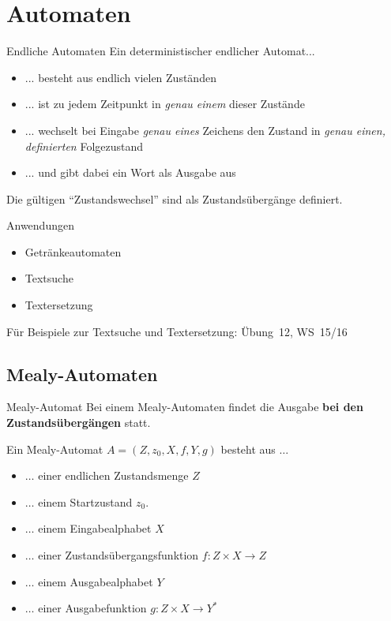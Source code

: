 \section{Automaten}

\begin{frame}{Endliche Automaten}
	Ein deterministischer endlicher Automat...
	\begin{itemize}
		\item ... besteht aus endlich vielen Zuständen
		\item ... ist zu jedem Zeitpunkt in \emph{genau einem} dieser Zustände
		\item ... wechselt bei Eingabe \emph{genau eines} Zeichens den Zustand in \emph{genau einen, definierten} Folgezustand
		\item ... und gibt dabei ein Wort als Ausgabe aus
	\end{itemize}

	Die gültigen \enquote{Zustandswechsel} sind als Zustandsübergänge definiert.
\end{frame}

\begin{frame}{Anwendungen}
	\begin{itemize}
		\item Getränkeautomaten
		\item Textsuche
		\item Textersetzung
	\end{itemize}

	Für Beispiele zur Textsuche und Textersetzung: Übung~12, WS~15/16
\end{frame}

\subsection{Mealy-Automaten}
\begin{frame}{Mealy-Automat}
	Bei einem Mealy-Automaten findet die Ausgabe \textbf{bei den Zustandsübergängen} statt.
	\begin{Definition}
		Ein Mealy-Automat $ A = (Z,z_0,X,f,Y,g)$ besteht aus $\dots$
		\begin{itemize}[<+->]
			\item $\dots$ einer endlichen Zustandsmenge $Z$ 
			\item $\dots$ einem Startzustand $z_0$.
			\item $\dots$ einem Eingabealphabet $X$ 
			\item $\dots$ einer Zustandsübergangsfunktion $f:Z\times X \to Z $
			\item $\dots$ einem Ausgabealphabet $Y$
			\item $\dots$ einer Ausgabefunktion $g:Z\times X \to Y^* $ 
		\end{itemize}						
	\end{Definition}
\end{frame}

